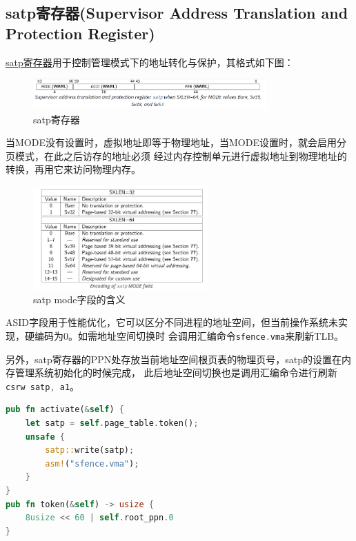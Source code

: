 \subsection{satp寄存器(Supervisor Address Translation and Protection Register)}

\href{https://five-embeddev.com/riscv-priv-isa-manual/Priv-v1.12/supervisor.html#sec:satp}{satp寄存器}用于控制管理模式下的地址转化与保护，其格式如下图：

\begin{figure}[htbp]
    \centering
    \includegraphics[width=0.8\textwidth]{../image/satp.png}
    \caption{satp寄存器}
    \label{fig:satp}
\end{figure}

当MODE没有设置时，虚拟地址即等于物理地址，当MODE设置时，就会启用分页模式，在此之后访存的地址必须
经过内存控制单元进行虚拟地址到物理地址的转换，再用它来访问物理内存。

\begin{figure}[htbp]
    \centering
    \includegraphics[width=0.6\textwidth]{../image/satpMode.png}
    \caption{satp mode字段的含义}
    \label{fig:satpMode}
\end{figure}

ASID字段用于性能优化，它可以区分不同进程的地址空间，但当前操作系统未实现，硬编码为0。如需地址空间切换时
会调用汇编命令\lstinline[language=Rust]{sfence.vma}来刷新TLB。

另外，satp寄存器的PPN处存放当前地址空间根页表的物理页号，satp的设置在内存管理系统初始化的时候完成，
此后地址空间切换也是调用汇编命令进行刷新\lstinline[language=Rust]{csrw satp, a1}。

\begin{lstlisting}[language=Rust,caption={satp设置}, label={lst:kernel-sections}]
pub fn activate(&self) {
    let satp = self.page_table.token();
    unsafe {
        satp::write(satp);
        asm!("sfence.vma");
    }
}
pub fn token(&self) -> usize {
    8usize << 60 | self.root_ppn.0
}
\end{lstlisting}

